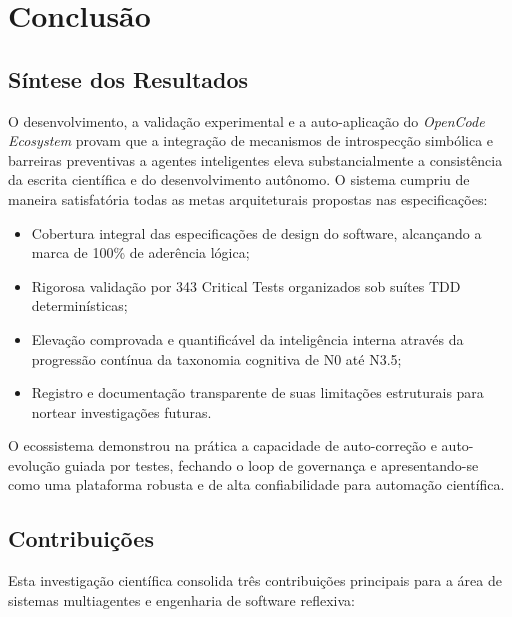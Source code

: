 \documentclass[12pt,a4paper,oneside]{abntex2}
\begin{document}

\chapter{Conclusão}
\label{ch:conclusao}

\section{Síntese dos Resultados}

O desenvolvimento, a validação experimental e a auto-aplicação do \textit{OpenCode Ecosystem} provam que a integração de mecanismos de introspecção simbólica e barreiras preventivas a agentes inteligentes eleva substancialmente a consistência da escrita científica e do desenvolvimento autônomo. O sistema cumpriu de maneira satisfatória todas as metas arquiteturais propostas nas especificações:

\begin{itemize}
    \item Cobertura integral das especificações de design do software, alcançando a marca de 100\% de aderência lógica;
    \item Rigorosa validação por 343 Critical Tests organizados sob suítes TDD determinísticas;
    \item Elevação comprovada e quantificável da inteligência interna através da progressão contínua da taxonomia cognitiva de N0 até N3.5;
    \item Registro e documentação transparente de suas limitações estruturais para nortear investigações futuras.
\end{itemize}

O ecossistema demonstrou na prática a capacidade de auto-correção e auto-evolução guiada por testes, fechando o loop de governança e apresentando-se como uma plataforma robusta e de alta confiabilidade para automação científica.

\section{Contribuições}

Esta investigação científica consolida três contribuições principais para a área de sistemas multiagentes e engenharia de software reflexiva:
\end{document}
